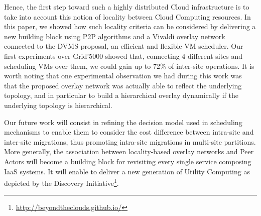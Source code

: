 Hence, the first step toward such a highly distributed Cloud infrastructure is to take
into account this notion of locality between Cloud Computing resources. In this paper, we
showed how such locality criteria can be considered by delivering a new building block using
P2P algorithms and a Vivaldi overlay network connected to the DVMS proposal, an efficient and
flexible VM scheduler. Our first experiments over Grid'5000 showed that, connecting 4
different sites and scheduling VMs over them, we could gain up to 72\% of inter-site
operations. It is worth noting that one experimental observation we had during this work
was that the proposed overlay network was actually able to
reflect the underlying topology, and in particular to build a hierarchical overlay
dynamically if the underlying topology is hierarchical.

Our future work will consist in refining the decision model used in scheduling mechanisms
to enable them to consider the cost difference between intra-site and inter-site
migrations, thus promoting intra-site migrations in multi-site partitions. More generally,
the association between locality-based overlay networks and Peer Actors will become a building block
for revisiting every single service composing IaaS systems. It will enable to deliver a
new generation of Utility Computing as depicted by the Discovery
Initiative\footnote{\url{http://beyondtheclouds.github.io/}}.
